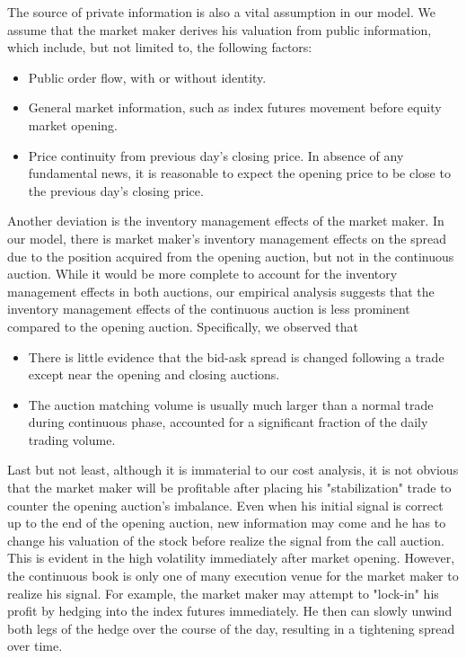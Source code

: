 The source of private information is also a vital assumption in our model. We assume that the market maker derives his valuation from public information, which include, but not limited to, the following factors:

\begin{itemize}
  \item Public order flow, with or without identity.
  \item General market information, such as index futures movement before equity market opening.
  \item Price continuity from previous day's closing price. In absence of any fundamental news, it is reasonable to expect the opening price to be close to the previous day's closing price.
\end{itemize}

Another deviation is the inventory management effects of the market maker. In our model, there is market maker's inventory management effects on the spread due to the position acquired from the opening auction, but not in the continuous auction. While it would be more complete to account for the inventory management effects in both auctions, our empirical analysis suggests that the inventory management effects of the continuous auction is less prominent compared to the opening auction. Specifically, we observed that

\begin{itemize}
  \item There is little evidence that the bid-ask spread is changed following a trade except near the opening and closing auctions.
  \item The auction matching volume is usually much larger than a normal trade during continuous phase, accounted for a significant fraction of the daily trading volume.
\end{itemize}

Last but not least, although it is immaterial to our cost analysis, it is not obvious that the market maker will be profitable after placing his "stabilization" trade to counter the opening auction's imbalance. Even when his initial signal is correct up to the end of the opening auction, new information may come and he has to change his valuation of the stock before realize the signal from the call auction. This is evident in the high volatility immediately after market opening. However, the continuous book is only one of many execution venue for the market maker to realize his signal. For example, the market maker may attempt to "lock-in" his profit by hedging into the index futures immediately. He then can slowly unwind both legs of the hedge over the course of the day, resulting in a tightening spread over time.

